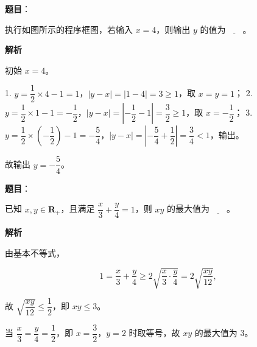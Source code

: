 \begin{answer}

\textbf{题目}：

执行如图所示的程序框图，若输入 $x=4$，则输出 $y$ 的值为$\underline{\qquad}$。
\nopagebreak[4]
\begin{center}\end{center}
\nopagebreak[4]
\textbf{解析}

初始 $x=4$。

1. $y=\dfrac12\times4-1=1$，$|y-x|=|1-4|=3\geqslant1$，取 $x=y=1$；
2. $y=\dfrac12\times1-1=-\dfrac12$，$\left|y-x\right|=\left|-\dfrac12-1\right|=\dfrac32\geqslant1$，取 $x=-\dfrac12$；
3. $y=\dfrac12\times\left(-\dfrac12\right)-1=-\dfrac54$，$\left|y-x\right|=\left|-\dfrac54+\dfrac12\right|=\dfrac34<1$，输出。

故输出 $y=-\dfrac54$。


\end{answer}
\begin{answer}

\textbf{题目}：

已知 $x,y\in\mathbf R_+$，且满足 $\dfrac x3+\dfrac y4=1$，则 $xy$ 的最大值为$\underline{\qquad}$。

\textbf{解析}

由基本不等式，

\nopagebreak[4]
\[1=\frac x3+\frac y4\geqslant2\sqrt{\frac{x}{3}\cdot\frac y4}=2\sqrt{\frac{xy}{12}},\]

故 $\sqrt{\dfrac{xy}{12}}\leqslant\dfrac12$，即 $xy\leqslant3$。

当 $\dfrac x3=\dfrac y4=\dfrac12$，即 $x=\dfrac32$，$y=2$ 时取等号，故 $xy$ 的最大值为 $3$。


\end{answer}
